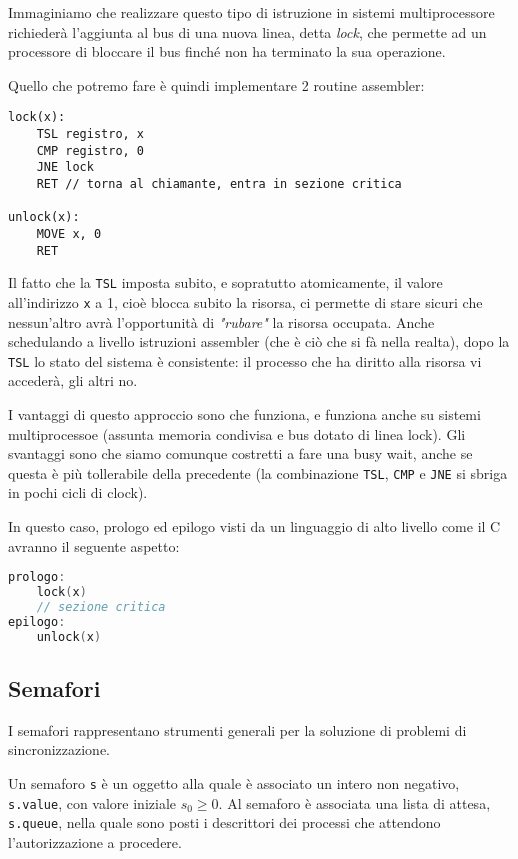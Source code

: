 \documentclass[a4paper,11pt]{article}
\begin{document}
Immaginiamo che realizzare questo tipo di istruzione in sistemi multiprocessore richiederà l'aggiunta al bus di una nuova linea, detta \textit{lock}, che permette ad un processore di bloccare il bus finché non ha terminato la sua operazione.

Quello che potremo fare è quindi implementare 2 routine assembler:
\begin{lstlisting}	
lock(x):
	TSL registro, x
	CMP registro, 0
	JNE lock
	RET // torna al chiamante, entra in sezione critica

unlock(x):
	MOVE x, 0
	RET
\end{lstlisting}

Il fatto che la \lstinline|TSL| imposta subito, e sopratutto atomicamente, il valore all'indirizzo \lstinline|x| a 1, cioè blocca subito la risorsa, ci permette di stare sicuri che nessun'altro avrà l'opportunità di \textit{"rubare"} la risorsa occupata.
Anche schedulando a livello istruzioni assembler (che è ciò che si fà nella realta), dopo la \lstinline|TSL| lo stato del sistema è consistente: il processo che ha diritto alla risorsa vi accederà, gli altri no.

I vantaggi di questo approccio sono che funziona, e funziona anche su sistemi multiprocessoe (assunta memoria condivisa e bus dotato di linea lock).
Gli svantaggi sono che siamo comunque costretti a fare una busy wait, anche se questa è più tollerabile della precedente (la combinazione \lstinline|TSL|, \lstinline|CMP| e \lstinline|JNE| si sbriga in pochi cicli di clock).

In questo caso, prologo ed epilogo visti da un linguaggio di alto livello come il C avranno il seguente aspetto:
\begin{lstlisting}[language=C++, style=codestyle]	
prologo: 
	lock(x)
	// sezione critica
epilogo:
	unlock(x)
\end{lstlisting}

\subsection{Semafori}
I semafori rappresentano strumenti generali per la soluzione di problemi di sincronizzazione.

Un semaforo \lstinline|s| è un oggetto alla quale è associato un intero non negativo, \lstinline|s.value|, con valore iniziale $s_0 \geq 0$.
Al semaforo è associata una lista di attesa, \lstinline|s.queue|, nella quale sono posti i descrittori dei processi che attendono l'autorizzazione a procedere.
\end{document}
